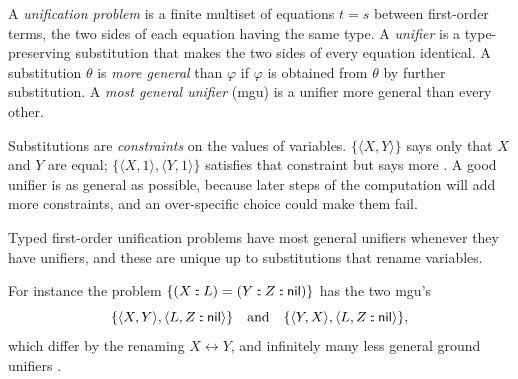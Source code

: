 \begin{definition}\label{def:horn-mgu}
A \emph{unification problem} is a finite multiset of equations $t=s$ between first-order terms, the two
sides of each equation having the same type. A \emph{unifier} is a type-preserving substitution that
makes the two sides of every equation identical. A substitution $\theta$ is \emph{more general} than
$\varphi$ if $\varphi$ is obtained from $\theta$ by further substitution. A \emph{most general unifier} (mgu)
is a unifier more general than every other.
\end{definition}
Substitutions are \emph{constraints} on the values of variables. $\{\langle X,Y\rangle\}$ says only that
$X$ and $Y$ are equal; $\{\langle X,1\rangle,\langle Y,1\rangle\}$ satisfies that constraint but says more
. A good unifier is as general as possible, because later steps of the computation will add
more constraints, and an over-specific choice could make them fail.

\begin{theorem}\label{thm:horn-mgu}
Typed first-order unification problems have most general unifiers whenever they have unifiers, and these
are unique up to substitutions that rename variables.
\end{theorem}
For instance the problem $\{(X\mathbin{:\!:}L)=(Y\mathbin{:\!:}Z\mathbin{:\!:}\mathsf{nil})\}$ has the two mgu's
\[
\{\langle X,Y\rangle,\langle L,Z\mathbin{:\!:}\mathsf{nil}\rangle\}
\quad\text{and}\quad
\{\langle Y,X\rangle,\langle L,Z\mathbin{:\!:}\mathsf{nil}\rangle\},
\]
which differ by the renaming $X\leftrightarrow Y$, and infinitely many less general ground unifiers .

